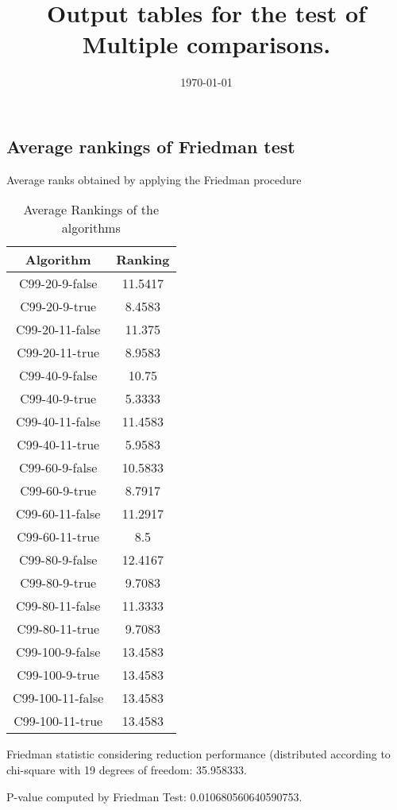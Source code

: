 \documentclass[a4paper,10pt]{article}
\title{Output tables for the test of Multiple comparisons.}
\author{}
\date{\today}
\begin{document}
\begin{landscape}
\pagestyle{empty}
\maketitle
\thispagestyle{empty}
\section{Average rankings of Friedman test}



Average ranks obtained by applying the Friedman procedure

\begin{table}[!htp]
\centering
\begin{tabular}{|c|c|}\hline
Algorithm&Ranking\\\hline
C99-20-9-false & 11.5417\\
C99-20-9-true & 8.4583\\
C99-20-11-false & 11.375\\
C99-20-11-true & 8.9583\\
C99-40-9-false & 10.75\\
C99-40-9-true & 5.3333\\
C99-40-11-false & 11.4583\\
C99-40-11-true & 5.9583\\
C99-60-9-false & 10.5833\\
C99-60-9-true & 8.7917\\
C99-60-11-false & 11.2917\\
C99-60-11-true & 8.5\\
C99-80-9-false & 12.4167\\
C99-80-9-true & 9.7083\\
C99-80-11-false & 11.3333\\
C99-80-11-true & 9.7083\\
C99-100-9-false & 13.4583\\
C99-100-9-true & 13.4583\\
C99-100-11-false & 13.4583\\
C99-100-11-true & 13.4583\\
\hline
\end{tabular}
\caption{Average Rankings of the algorithms}
\end{table}

Friedman statistic considering reduction performance (distributed according to chi-square with 19 degrees of freedom: 35.958333.

P-value computed by Friedman Test: 0.010680560640590753.\newline




\end{landscape}
\end{document}
